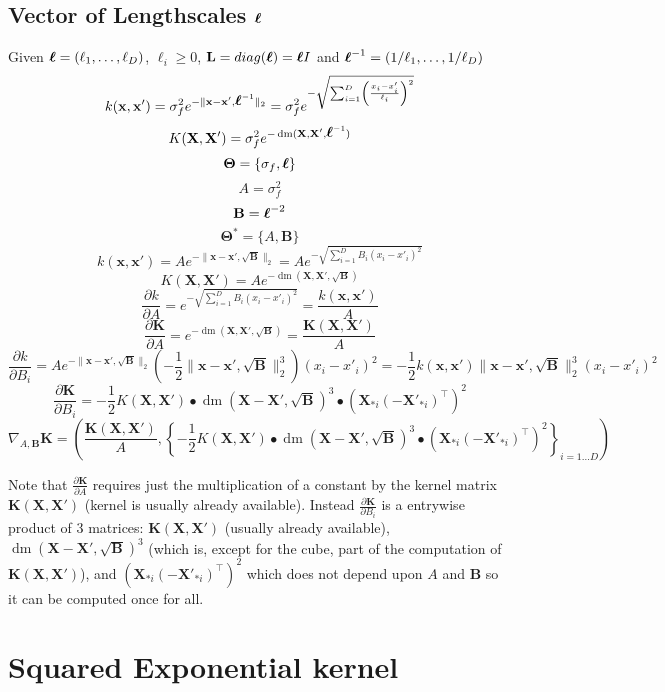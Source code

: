 \documentclass[a4paper,11pt]{article}
\newcommand\x{{\mathbf x}}
\newcommand\X{{\mathbf X}}
\newcommand\K{{\mathbf K}}
\newcommand\LL{{\mathbf L}}
\newcommand\ELL{{\Ivec \ell}}
\DeclareMathOperator*{\dm}{dm}
\newcommand{\Ivec}[1]{\mbox{\boldmath $#1$}}
\begin{document}
\subsection{Vector of Lengthscales $\Ivec{\ell}$}
Given $\Ivec{\ell} = (\ell_1,\ldots,\ell_D)$, $\ell_i \ge 0$, $\LL =
diag(\ELL) = \Ivec{\ell}I$ and $\ELL^{-1} =
(1/\ell_1,\ldots,1/\ell_D)$
$$k(\x,\x') = \sigma_f^2 e^{-\|\x-\x',\ELL^{-1}\|_2}= \sigma_f^2
  e^{-\sqrt{\sum_{i=1}^D \left(\frac{x_i - x'_i}{\ell_i}\right)^2}}$$
$$K(\X,\X') = \sigma_f^2 e^{-\dm(\X,\X',\ELL^{-1})}$$
$$\mathbf{\Theta} = \{ \sigma_f, \ELL\}$$
$$A = \sigma_f^2$$
$$\mathbf{B} = \ELL^{-2}$$
$$\mathbf{\Theta}^* = \{ A, \mathbf{B}\}$$
$$k(\x,\x') = A e^{-\|\x-\x',\sqrt{\mathbf{B}}\|_2} = A e^{-\sqrt{\sum_{i=1}^D
    B_i(x_i - x'_i)^2}}$$  
$$K(\X,\X') = A e^{-\dm(\X,\X',\sqrt{\mathbf{B}})}$$
$$\frac{\partial k}{\partial A} = e^{-\sqrt{\sum_{i=1}^D B_i(x_i -
    x'_i)^2}} = \frac{k(\x,\x')}{A}$$
$$\frac{\partial \K}{\partial A} = e^{-\dm(\X,\X',\sqrt{\mathbf{B}})} =
\frac{\K(\X,\X')}{A}$$ 
$$\frac{\partial k}{\partial B_i} = A e^{-\|\x-\x',\sqrt{\mathbf{B}}\|_2}
\left( -\frac{1}{2} \|\x-\x',\sqrt{\mathbf{B}}\|_2^3 \right) (x_i - x'_i)^2 =
-\frac{1}{2} k(\x,\x') \|\x-\x',\sqrt{\mathbf{B}}\|_2^3 (x_i - x'_i)^2 $$
$$\frac{\partial \K}{\partial B_i} = -\frac{1}{2} K(\X,\X')
\bullet \dm(\X-\X',\sqrt{\mathbf{B}})^3 \bullet (\X_{*i}
(-\X'_{*i})^{\top})^2$$ 
$$\nabla_{A,\mathbf{B}} \K = \left(\frac{\K(\X,\X')}{A}, \left\{-\frac{1}{2}
  K(\X,\X') \bullet \dm(\X-\X',\sqrt{\mathbf{B}})^3 \bullet (\X_{*i}
  (-\X'_{*i})^{\top})^2 \right\}_{i=1 \ldots D} \right)$$

Note that $\frac{\partial \K}{\partial A}$ requires just the
multiplication of a constant by the kernel matrix $\K(\X,\X')$ (kernel
is usually already available). Instead $\frac{\partial \K}{\partial
  B_i}$ is a entrywise product of 3 matrices: $\K(\X,\X')$ (usually
already available), $\dm(\X-\X',\sqrt{\mathbf{B}})^3$ (which is,
except for the cube, part of the computation of $\K(\X,\X')$), and
$(\X_{*i} (-\X'_{*i})^{\top})^2$ which does not depend upon $A$ and
$\mathbf{B}$ so it can be computed once for all.

\section{Squared Exponential kernel}
\end{document}
